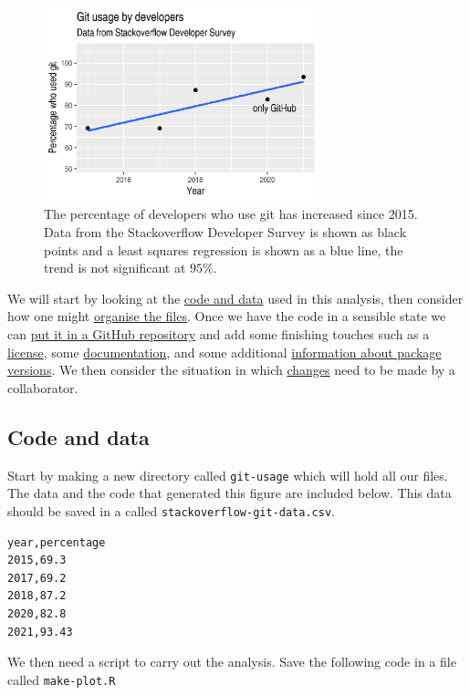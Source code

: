 \documentclass[11pt,onecolumn]{scrartcl}
\begin{document}
\begin{figure}[htbp]
\centering
\includegraphics[width=8cm]{./git-usage-1.png}
\caption{\label{fig:demo-result-1}The percentage of developers who use git has increased since 2015. Data from the Stackoverflow Developer Survey is shown as black points and a least squares regression is shown as a blue line, the trend is not significant at \(95\%\).}
\end{figure}

We will start by looking at the \hyperref[sec:orga4e5ff3]{code and data} used in this analysis, then
consider how one might \hyperref[sec:org0958a85]{organise the files}. Once we have the code in a sensible
state we can \hyperref[sec:org56a7d86]{put it in a GitHub repository} and add some finishing touches such
as a \hyperref[sec:org2a4f957]{license}, some \hyperref[sec:org49947a3]{documentation}, and some additional \hyperref[sec:org3d977e1]{information about package
versions}. We then consider the situation in which \hyperref[sec:orga8bc06b]{changes} need to be made by a
collaborator.

\subsection{Code and data}
\label{sec:orga4e5ff3}

Start by making a new directory called \texttt{git-usage} which will hold all our
files. The data and the code that generated this figure are included below. This
data should be saved in a called \texttt{stackoverflow-git-data.csv}.

\begin{Verbatim}[frame=single,framerule=0.5mm,framesep=2mm,label=Git Usage,xleftmargin=5cm,xrightmargin=5cm]
year,percentage
2015,69.3
2017,69.2
2018,87.2
2020,82.8
2021,93.43
\end{Verbatim}

We then need a script to carry out the analysis. Save the following code in a
file called \texttt{make-plot.R}
\end{document}

